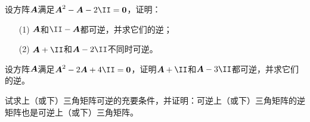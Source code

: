 \begin{frame}
  \begin{footnotesize}
    \begin{li}{45}
      设方阵$\boldsymbol{A}$满足$\A^2-\A-2\II=\zero$，证明：
      \begin{itemize}
      \item[(1)]$\boldsymbol{A}$和$\II-\A$都可逆，并求它们的逆；
      \item[(2)]$\A+\II$和$\A-2\II$不同时可逆。
      \end{itemize}
    \end{li}
  \end{footnotesize}
\end{frame}



\begin{frame}
  \begin{footnotesize}
    \begin{li}{46}
      设方阵$\boldsymbol{A}$满足$\A^2-2\A+4\II=\zero$，证明$\A+\II$和$\A-3\II$都可逆，并求它们的逆。
    \end{li}
  \end{footnotesize}
\end{frame}



\begin{frame}
  \begin{footnotesize}
    \begin{li}{47}
      试求上（或下）三角矩阵可逆的充要条件，并证明：可逆上（或下）三角矩阵的逆矩阵也是可逆上（或下）三角矩阵。
    \end{li}
  \end{footnotesize}
\end{frame}



\begin{frame}
  \begin{footnotesize}
    \begin{li}{28}
      
    \end{li}
  \end{footnotesize}
\end{frame}


\begin{frame}
  \begin{footnotesize}
    \begin{li}{28}
      
    \end{li}
  \end{footnotesize}
\end{frame}



